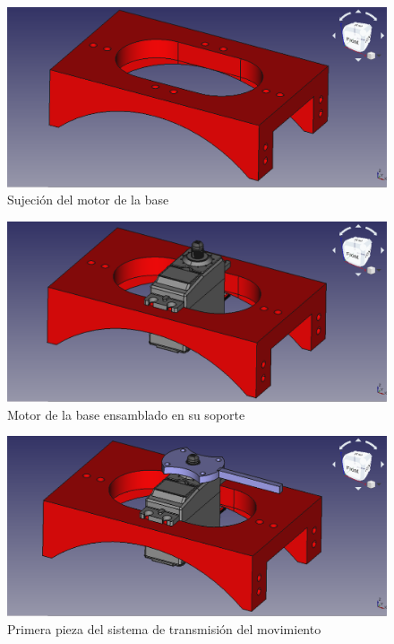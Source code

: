 \begin{figure}[H]
    \centering 
    \includegraphics[width=1\linewidth]{pictures/MotorHold.png}
    \caption{Sujeción del motor de la base}
    \label{fig:sujección_motor_base}
\end{figure}

\begin{figure}[H]
    \centering 
    \includegraphics[width=1\linewidth]{pictures/MotorHoldYMotor.png}
    \caption{Motor de la base ensamblado en su soporte}
    \label{fig:motor_ensamblado_soporte}
\end{figure}

\begin{figure}[H]
    \centering 
    \includegraphics[width=1\linewidth]{pictures/MotorMasPrimeraPieza.png}
    \caption{Primera pieza del sistema de transmisión del movimiento}
    \label{fig:primera_pieza_sistema_transmision}
\end{figure}

